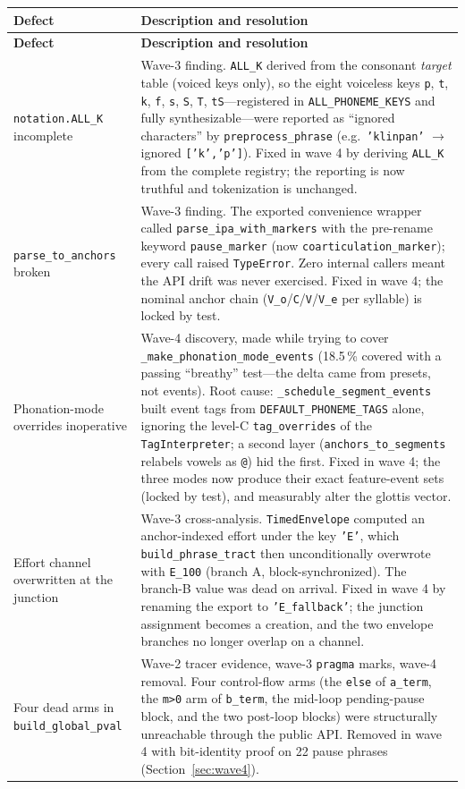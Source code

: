 \documentclass[11pt,a4paper]{article}
\newcommand{\code}[1]{\texttt{#1}}
\begin{document}
\begin{longtable}{@{\extracolsep{\fill}} p{} p{}}
\toprule
\textbf{Defect} & \textbf{Description and resolution} \\
\midrule
\endfirsthead
\toprule
\textbf{Defect} & \textbf{Description and resolution} \\
\midrule
\endhead
\bottomrule
\endfoot
\code{notation.ALL\_K} incomplete &
Wave-3 finding. \code{ALL\_K} derived from the consonant
\emph{target} table (voiced keys only), so the eight voiceless keys
\code{p}, \code{t}, \code{k}, \code{f}, \code{s}, \code{S},
\code{T}, \code{tS}---registered in \code{ALL\_PHONEME\_KEYS} and
fully synthesizable---were reported as ``ignored characters'' by
\code{preprocess\_phrase} (e.g.\ \code{'klinpan'} $\to$ ignored
\code{['k','p']}). Fixed in wave 4 by deriving \code{ALL\_K} from
the complete registry; the reporting is now truthful and
tokenization is unchanged. \\
\addlinespace
\code{parse\_to\_anchors} broken &
Wave-3 finding. The exported convenience wrapper called
\code{parse\_ipa\_with\_markers} with the pre-rename keyword
\code{pause\_marker} (now \code{coarticulation\_marker}); every
call raised \code{TypeError}. Zero internal callers meant the API
drift was never exercised. Fixed in wave 4; the nominal anchor
chain (\code{V\_o}/\code{C}/\code{V}/\code{V\_e} per syllable) is
locked by test. \\
\addlinespace
Phonation-mode overrides inoperative &
Wave-4 discovery, made while trying to cover
\code{\_make\_phonation\_mode\_events} (18.5\,\% covered with a
passing ``breathy'' test---the delta came from presets, not
events). Root cause: \code{\_schedule\_segment\_events} built event
tags from \code{DEFAULT\_PHONEME\_TAGS} alone, ignoring the
level-C \code{tag\_overrides} of the \code{TagInterpreter}; a
second layer (\code{anchors\_to\_segments} relabels vowels as
\code{@}) hid the first. Fixed in wave 4; the three modes now
produce their exact feature-event sets (locked by test), and
measurably alter the glottis vector. \\
\addlinespace
Effort channel overwritten at the junction &
Wave-3 cross-analysis. \code{TimedEnvelope} computed an
anchor-indexed effort under the key \code{'E'}, which
\code{build\_phrase\_tract} then unconditionally overwrote with
\code{E\_100} (branch A, block-synchronized). The branch-B value
was dead on arrival. Fixed in wave 4 by renaming the export to
\code{'E\_fallback'}; the junction assignment becomes a creation, and
the two envelope branches no longer overlap on a channel. \\
\addlinespace
Four dead arms in \code{build\_global\_pval} &
Wave-2 tracer evidence, wave-3 \code{pragma} marks, wave-4 removal.
Four control-flow arms (the \code{else} of \code{a\_term}, the
\code{m>0} arm of \code{b\_term}, the mid-loop pending-pause block,
and the two post-loop blocks) were structurally unreachable through
the public API. Removed in wave 4 with bit-identity proof on 22 pause
phrases (Section~\ref{sec:wave4}). \\
\end{longtable}
\end{document}
